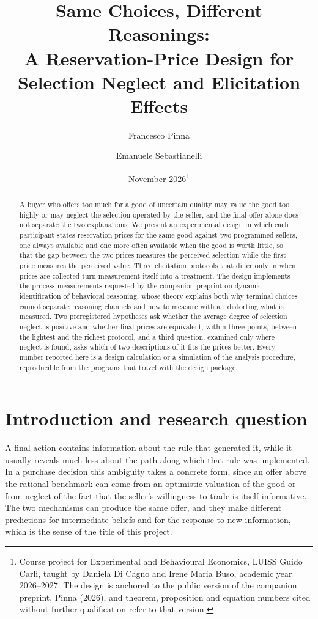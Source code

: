 \documentclass[11pt,a4paper]{article}
\title{Same Choices, Different Reasonings:\\ A Reservation-Price Design for Selection Neglect and Elicitation Effects}
\author{Francesco Pinna \and Emanuele Sebastianelli}
\date{November 2026\thanks{Course project for Experimental and Behavioural Economics, LUISS Guido Carli, taught by Daniela Di Cagno and Irene Maria Buso, academic year 2026--2027. The design is anchored to the public version of the companion preprint, Pinna (2026), and theorem, proposition and equation numbers cited without further qualification refer to that version.}}
\begin{document}
\maketitle

\begin{abstract}
\noindent A buyer who offers too much for a good of uncertain quality may value the good too highly or may neglect the selection operated by the seller, and the final offer alone does not separate the two explanations. We present an experimental design in which each participant states reservation prices for the same good against two programmed sellers, one always available and one more often available when the good is worth little, so that the gap between the two prices measures the perceived selection while the first price measures the perceived value. Three elicitation protocols that differ only in when prices are collected turn measurement itself into a treatment. The design implements the process measurements requested by the companion preprint on dynamic identification of behavioral reasoning, whose theory explains both why terminal choices cannot separate reasoning channels and how to measure without distorting what is measured. Two preregistered hypotheses ask whether the average degree of selection neglect is positive and whether final prices are equivalent, within three points, between the lightest and the richest protocol, and a third question, examined only where neglect is found, asks which of two descriptions of it fits the prices better. Every number reported here is a design calculation or a simulation of the analysis procedure, reproducible from the programs that travel with the design package.
\end{abstract}

\section{Introduction and research question}

A final action contains information about the rule that generated it, while it usually reveals much less about the path along which that rule was implemented. In a purchase decision this ambiguity takes a concrete form, since an offer above the rational benchmark can come from an optimistic valuation of the good or from neglect of the fact that the seller's willingness to trade is itself informative. The two mechanisms can produce the same offer, and they make different predictions for intermediate beliefs and for the response to new information, which is the sense of the title of this project.
\end{document}
